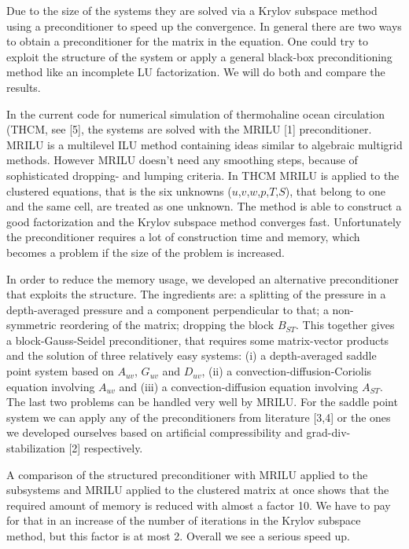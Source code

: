 \documentclass{report}
\begin{document}
Due to the size of the systems they are solved via a Krylov subspace
method using a preconditioner to speed up the convergence. In general
there are two ways to obtain a preconditioner for the matrix in the
equation. One could try to exploit the structure of the system or apply
a general black-box preconditioning method like an incomplete LU
factorization. We will do both and compare the results.

In the current code for numerical simulation of thermohaline ocean
circulation (THCM, see [5], the systems are solved with the MRILU [1]
preconditioner. MRILU is a multilevel ILU method containing ideas
similar to algebraic multigrid methods. However MRILU doesn't need any
smoothing steps, because of sophisticated dropping- and lumping
criteria. In THCM MRILU is applied to the clustered equations, that is
the six unknowns ($u$,$v$,$w$,$p$,$T$,$S$),
that belong to one and the same cell,
are treated as one unknown. The method is able to construct a good
factorization and the Krylov subspace method converges fast.
Unfortunately the preconditioner requires a lot of construction time
and memory, which becomes a problem if the size of the problem is
increased.

In order to reduce the memory usage, we developed an alternative
preconditioner that exploits the structure. The ingredients are: a
splitting of the pressure in a depth-averaged pressure and a component
perpendicular to that; a non-symmetric reordering of the matrix;
dropping the block $B_{ST}$. This together gives a block-Gauss-Seidel
preconditioner, that requires some matrix-vector products and the
solution of three relatively easy systems: (i) a depth-averaged saddle
point system based on $A_{uv}$, $G_{uv}$ and $D_{uv}$, (ii) a
convection-diffusion-Coriolis equation involving $A_{uv}$ and (iii) a
convection-diffusion equation involving $A_{ST}$. The last two problems can
be handled very well by MRILU. For the saddle point system we can apply
any of the preconditioners from literature [3,4] or the ones we
developed ourselves based on artificial compressibility and
grad-div-stabilization [2] respectively.

A comparison of the structured preconditioner with MRILU applied to the
subsystems and MRILU applied to the clustered matrix at once shows that
the required amount of memory is reduced with almost a factor 10. We
have to pay for that in an increase of the number of iterations in the
Krylov subspace method, but this factor is at most 2. Overall we see a
serious speed up.
\end{document}
